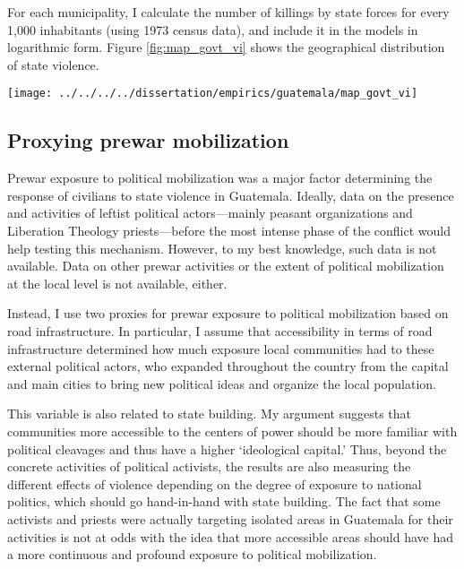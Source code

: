 \documentclass[12pt, notitlepage]{article}
\begin{document}
For each municipality, I calculate the number of killings by state forces for every 1,000 inhabitants (using 1973 census data), and include it in the models in logarithmic form.
Figure \ref{fig:map_govt_vi} shows the geographical distribution of state violence.

\begin{figure*}[htb!]
  \centering
    \texttt{[image: ../../../../dissertation/empirics/guatemala/map\_govt\_vi]}

  \caption{State violence against civilians in Guatemala, 1978--1985} \label{fig:map_govt_vi}

\end{figure*}

\subsection*{Proxying prewar mobilization}

Prewar exposure to political mobilization was a major factor determining the response of civilians to state violence in Guatemala.
Ideally, data on the presence and activities of leftist political actors---mainly peasant organizations and Liberation Theology priests---before the most intense phase of the conflict would help testing this mechanism.
However, to my best knowledge, such data is not available.
Data on other prewar activities or the extent of political mobilization at the local level is not available, either.

Instead, I use two proxies for prewar exposure to political mobilization based on road infrastructure.
In particular, I assume that accessibility in terms of road infrastructure determined how much exposure local communities had to these external political actors, who expanded throughout the country from the capital and main cities to bring new political ideas and organize the local population.

This variable is also related to state building.
My argument suggests that communities more accessible to the centers of power should be more familiar with political cleavages and thus have a higher `ideological capital.'
Thus, beyond the concrete activities of political activists, the results are also measuring the different effects of violence depending on the degree of exposure to national politics, which should go hand-in-hand with state building.
The fact that some activists and priests were actually targeting isolated areas in Guatemala for their activities is not at odds with the idea that more accessible areas should have had a more continuous and profound exposure to political mobilization.
\end{document}
